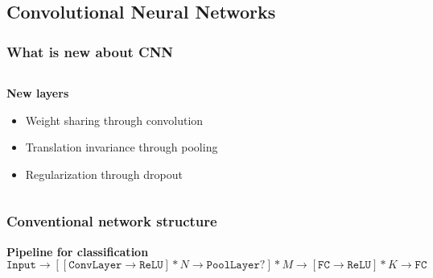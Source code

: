 \subsection{Convolutional Neural Networks}
\begin{frame}[t]
\frametitle{What is new about CNN}

\begin{columns}[T]
\begin{column}{0.5\textwidth}
\begin{block}{\bf New layers}
\begin{itemize}
  \item<1-|alert@+> Weight sharing through convolution
  \item<2-|alert@+> Translation invariance through pooling
  \item<3-|alert@+> Regularization through dropout
\end{itemize}
\end{block}
\end{column}

\begin{column}{0.5\textwidth}
\end{column}
\end{columns}

\end{frame}

\begin{frame}[t]
\frametitle{Conventional network structure}
\begin{block}{\bf Pipeline for classification}
  \scriptsize
  $$\mathtt{Input} \rightarrow [[\mathtt{ConvLayer} \rightarrow \mathtt{ReLU}] * N \rightarrow \mathtt{PoolLayer}?]*M \rightarrow [\mathtt{FC}\rightarrow \mathtt{ReLU}]*K \rightarrow \mathtt{FC}$$
  \vspace{-0.7cm}
  \vspace{-0.7cm}{\tiny\em http://www.mathworks.com/help/nnet/convolutional-neural-networks.html}
\end{block}
\end{frame}

